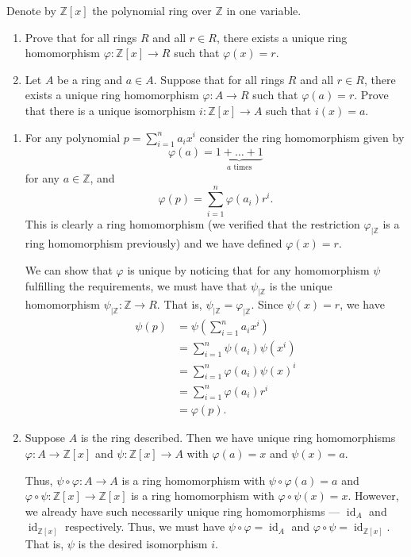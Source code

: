 \documentclass[letterpaper, 12pt]{hmcpset}
\begin{document}
\pagebreak

\begin{problem}[0.13]
	Denote by $\mathbb Z[x]$ the polynomial ring over $\mathbb Z$ in one variable.
	\begin{enumerate}
		\item Prove that for all rings $R$ and all $r \in R$, there exists a unique ring homomorphism $\varphi : \mathbb Z[x] \to R$ such that $\varphi(x) = r$.
		\item Let $A$ be a ring and $a \in A$. Suppose that for all rings $R$ and all $r \in R$, there exists a unique ring homomorphism $\varphi : A \to R$ such that $\varphi(a) = r$. Prove that there is a unique isomorphism $i : \mathbb Z[x] \to A$ such that $i(x) = a$.
	\end{enumerate}
\end{problem}

\begin{solution}
	\begin{enumerate}
		\item For any polynomial $p = \sum_{i = 1}^n a_i x^i$ consider the ring homomorphism given by
			\[
				\varphi(a) = \underbrace{1 + \dots + 1}_{a \text{ times}}
			\]
			for any $a \in \mathbb{Z}$, and
			\[
				\varphi(p) = \sum_{i = 1}^n \varphi(a_i) r^i.
			\]
			This is clearly a ring homomorphism (we verified that the restriction $\varphi_{| \mathbb{Z}}$ is a ring homomorphism previously) and we have defined ${\varphi(x) = r}$.

			We can show that $\varphi$ is unique by noticing that for any homomorphism $\psi$ fulfilling the requirements, we must have that $\psi_{| \mathbb{Z}}$ is the unique homomorphism $\psi_{|\mathbb{Z}} : \mathbb{Z} \to R$. That is, $\psi_{\mid \mathbb{Z}} = \varphi_{\mid \mathbb{Z}}$. Since $\psi(x) = r$, we have
			\[
				\begin{split}
					\psi(p) & = \psi \left ( \sum_{i = 1}^n a_i x^i \right ) \\
						& = \sum_{i = 1}^n \psi(a_i) \psi(x^i) \\
						& = \sum_{i = 1}^n \varphi(a_i) \psi(x)^i \\
						& = \sum_{i = 1}^n \varphi(a_i) r^i \\
						& = \varphi(p).
				\end{split}
			\]
		\item Suppose $A$ is the ring described. Then we have unique ring homomorphisms ${\varphi : A \to \mathbb Z[x]}$ and $\psi : \mathbb Z[x] \to A$ with $\varphi(a) = x$ and $\psi(x) = a$.

			Thus, $\psi \circ \varphi: A \to A$ is a ring homomorphism with $\psi \circ \varphi(a) = a$ and $\varphi \circ \psi : \mathbb Z[x] \to \mathbb Z[x]$ is a ring homomorphism with $\varphi \circ \psi(x) = x$. However, we already have such necessarily unique ring homomorphisms --- $\operatorname{id}_A$ and $\operatorname{id}_{\mathbb Z[x]}$ respectively. Thus, we must have $\psi \circ \varphi = \operatorname{id}_A$ and $\varphi \circ \psi = \operatorname{id}_{\mathbb Z[x]}$. That is, $\psi$ is the desired isomorphism $i$.
	\end{enumerate}
\end{solution}
\end{document}
